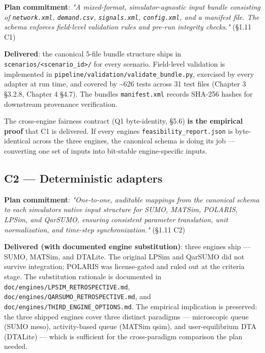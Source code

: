 \textbf{Plan commitment}: \emph{"A mixed-format, simulator-agnostic
input bundle consisting of \texttt{network.xml}, \texttt{demand.csv},
\texttt{signals.xml}, \texttt{config.xml}, and a manifest file. The
schema enforces field-level validation rules and pre-run integrity
checks."} (§1.11 C1)

\textbf{Delivered}: the canonical 5-file bundle structure ships in
\texttt{scenarios/\textless{}scenario\_id\textgreater{}/} for every
scenario. Field-level validation is implemented in
\texttt{pipeline/validation/validate\_bundle.py}, exercised by every
adapter at run time, and covered by \textasciitilde626 tests across 31
test files (Chapter 3 §3.2.8, Chapter 4 §4.7). The
bundle\textquotesingle s \texttt{manifest.xml} records SHA-256 hashes
for downstream provenance verification.

The cross-engine fairness contract (Q1 byte-identity, §5.6) \textbf{is
the empirical proof} that C1 is delivered. If every
engine\textquotesingle s \texttt{feasibility\_report.json} is
byte-identical across the three engines, the canonical schema is doing
its job --- converting one set of inputs into bit-stable engine-specific
inputs.

\subsection{C2 --- Deterministic
adapters}\label{612-c2--deterministic-adapters}

\textbf{Plan commitment}: \emph{"One-to-one, auditable mappings from
the canonical schema to each simulator\textquotesingle s native input
structure for SUMO, MATSim, POLARIS, LPSim, and QarSUMO, ensuring
consistent parameter translation, unit normalization, and time-step
synchronization."} (§1.11 C2)

\textbf{Delivered (with documented engine substitution)}: three engines
ship --- SUMO, MATSim, and DTALite. The original LPSim and QarSUMO did
not survive integration; POLARIS was license-gated and ruled out at the
criteria stage. The substitution rationale is documented in
\texttt{doc/engines/LPSIM\_RETROSPECTIVE.md},
\texttt{doc/engines/QARSUMO\_RETROSPECTIVE.md}, and
\texttt{doc/engines/THIRD\_ENGINE\_OPTIONS.md}. The empirical
implication is preserved: the three shipped engines cover three distinct
paradigms --- microscopic queue (SUMO meso), activity-based queue
(MATSim qsim), and user-equilibrium DTA (DTALite) --- which is
sufficient for the cross-paradigm comparison the plan needed.

